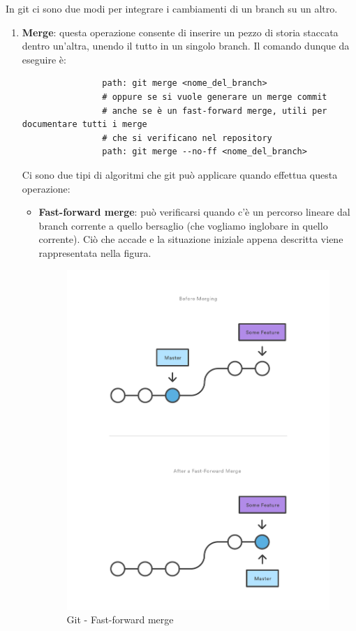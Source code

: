 		In git ci sono due modi per integrare i cambiamenti di un branch su un altro.
			\begin{enumerate}
				\item \textbf{Merge}: questa operazione consente di inserire un pezzo di storia staccata dentro un'altra, unendo il tutto in un singolo branch. Il comando dunque da eseguire è:
				\begin{verbatim}
				path: git merge <nome_del_branch>
				# oppure se si vuole generare un merge commit
				# anche se è un fast-forward merge, utili per documentare tutti i merge
				# che si verificano nel repository
				path: git merge --no-ff <nome_del_branch>
				\end{verbatim}
				Ci sono due tipi di algoritmi che git può applicare quando effettua questa operazione:
					\begin{itemize}
						\item \textbf{Fast-forward merge}: può verificarsi quando c'è un percorso lineare dal branch corrente a quello bersaglio (che vogliamo inglobare in quello corrente). Ciò che accade e la situazione iniziale appena descritta viene rappresentata nella figura.
						\begin{figure}[htbp]
							\centering
							\includegraphics[scale=0.6]{images/fast_forward_merge.pdf}
							\caption{Git - Fast-forward merge}
							\label{fig:git_fast_forward_merge}
						\end{figure}


\end{itemize}
\end{enumerate}
